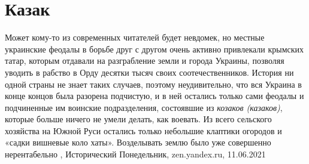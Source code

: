  
 
 
 
 
\chapter{Казак}
\label{sec:slova.kazak}

Может кому-то из современных читателей будет невдомек, но местные украинские
феодалы в борьбе друг с другом очень активно привлекали крымских татар, которым
отдавали на разграбление земли и города Украины, позволяя уводить в рабство в
Орду десятки тысяч своих соотечественников. История ни одной страны не знает
таких случаев, поэтому неудивительно, что вся Украина в конце концов была
разорена подчистую, и в ней остались только сами феодалы и подчиненные им
воинские подразделения, состоявшие из \emph{козаков (казаков)}, которые больше ничего
не умели делать, как воевать. Из всего сельского хозяйства на Южной Руси
остались только небольшие клаптики огородов и «садки вишневые коло хаты».
Возделывать землю было уже совершенно нерентабельно
, 
Исторический Понедельник, zen.yandex.ru, 11.06.2021

